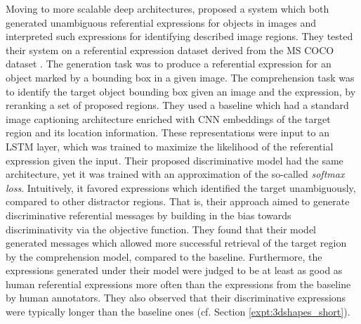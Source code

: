 Moving to more scalable deep architectures, \cite{mao2016generation} proposed a system which both generated unambiguous referential expressions for objects in images and interpreted such expressions for identifying described image regions. They tested their system on a referential expression dataset derived from the MS COCO dataset \parencite{chen2015microsoft}. %
The generation task was to produce a referential expression for an object marked by a bounding box in a given image. The comprehension task was to identify the target object bounding box given an image and the expression, by reranking a set of proposed regions.
They used a baseline which had a standard image captioning architecture \parencite[cf.][]{vinyals2015show} enriched with CNN embeddings of the target region and its location information. These representations were input to an LSTM layer, which was trained to maximize the likelihood of the referential expression given the input. Their proposed discriminative model had the same architecture, yet it was trained with an approximation of the so-called \textit{softmax loss}. Intuitively, it favored expressions which identified the target unambiguously, compared to other distractor regions. 
That is, their approach aimed to generate discriminative referential messages by building in the bias towards discriminativity via the objective function.  
They found that their model generated messages which allowed more successful retrieval of the target region by the comprehension model, compared to the baseline. Furthermore, the expressions generated under their model were judged to be at least as good as human referential expressions more often than the expressions from the baseline by human annotators. They also observed that their discriminative expressions were typically longer than the baseline ones (cf. Section \ref{expt:3dshapes_short}). 

